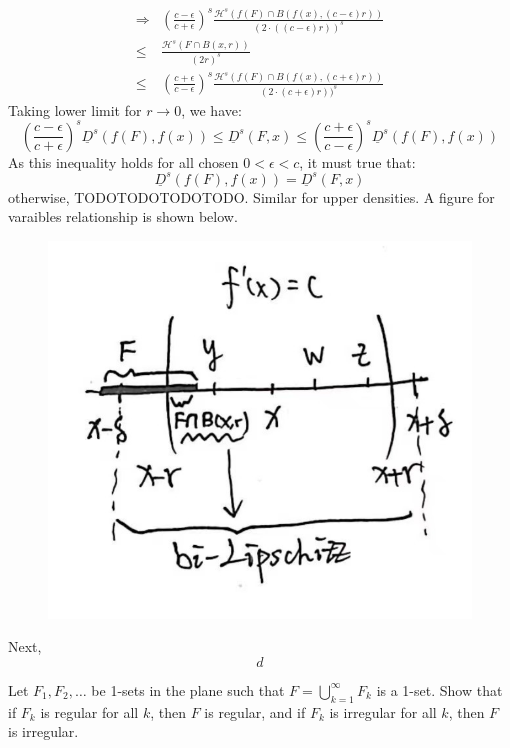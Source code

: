 \begin{customsol}{5.2}
$$    \begin{aligned}
        \Rightarrow &\left(\frac{c-\epsilon}{c+\epsilon}\right)^{s} \frac{\mathcal{H}^{s}(f(F) \cap B(f(x),(c-\epsilon) r))}{(2\cdot((c-\epsilon) r))^{s}} \\
        \leq & \frac{\mathcal{H}^{s}(F \cap B(x, r))}{(2 r)^{s}} \\
        \leq &\left(\frac{c+\epsilon}{c-\epsilon}\right)^{s} \frac{\mathcal{H}^{s}(f(F) \cap B(f(x),(c+\epsilon) r))}{(2\cdot(c+\epsilon) r))^{s}}
    \end{aligned}
    $$
    Taking lower limit for $r\rightarrow 0$, we have:
    $$
    \left(\frac{c-\epsilon}{c+\epsilon}\right)^{s} \underline{D}^{s}(f(F), f(x)) \leq \underline{D}^{s}(F, x) \leq\left(\frac{c+\epsilon}{c-\epsilon}\right)^{s} \underline{D}^{s}(f(F), f(x))
    $$
    As this inequality holds for all chosen $0 < \epsilon < c$, it must true that:
    $$
    \underline{D}^{s}(f(F), f(x))=\underline{D}^{s}(F, x)
    $$
    otherwise, TODOTODOTODOTODO.
    Similar for upper densities. 
    A figure for varaibles relationship is shown below.
    \begin{figure}[H]
        \centering
        \includegraphics[width=.35\textwidth]{images/5_2.png}
        \label{fig:e5.2}
    \end{figure}

    Next,
    $$
    d
    $$
\end{customsol}
    


\begin{customexercise}{5.8}
    Let $F_{1}, F_{2}, \ldots$ be 1-sets in the plane such that $F=\bigcup_{k=1}^{\infty} F_{k}$ is a 1-set. Show that if $F_{k}$ is regular for all $k$, then $F$ is regular, and if $F_{k}$ is irregular for all $k$, then $F$ is irregular.
\end{customexercise}

